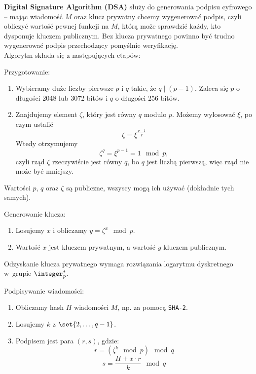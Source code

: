 \textbf{Digital Signature Algorithm (DSA)} służy do generowania podpisu cyfrowego -- mając wiadomość \( M \) oraz klucz prywatny chcemy wygenerować podpis, czyli obliczyć wartość pewnej funkcji na \( M \), którą może sprawdzić każdy, kto dysponuje kluczem publicznym.
Bez klucza prywatnego powinno być trudno wygenerować podpis przechodzący pomyślnie weryfikację. \\

\noindent
Algorytm składa się z następujących etapów:
\begin{greyframe}
	Przygotowanie:
	\begin{enumerate}
		\item Wybieramy duże liczby pierwsze \( p \) i \( q \) takie, że \( q \mid (p-1) \). Zaleca się \( p \) o długości 2048 lub 3072 bitów i \( q \) o długości 256 bitów.
		\item Znajdujemy element \( \zeta \), który jest równy \( q \) modulo \( p \). Możemy wylosować \( \xi \), po czym ustalić
		      \[
			      \zeta = \xi^{\frac{p-1}{q}}
		      \]
		      Wtedy otrzymujemy
		      \[
			      \zeta^q = \xi^{p-1} = 1 \mod p,
		      \]
		      czyli rząd \( \zeta \) rzeczywiście jest równy \( q \), bo \( q \) jest liczbą pierwszą, więc rząd nie może być mniejszy.
	\end{enumerate}
\end{greyframe}
Wartości \( p \), \( q \) oraz \( \zeta \) są publiczne, wszyscy mogą ich używać (dokładnie tych samych).

\begin{greyframe}
	Generowanie klucza:
	\begin{enumerate}
		\item Losujemy \( x \) i obliczamy \( y = \zeta^x \mod p \).
		\item Wartość \( x \) jest kluczem prywatnym, a wartość \( y \) kluczem publicznym.
	\end{enumerate}
\end{greyframe}
Odzyskanie klucza prywatnego wymaga rozwiązania logarytmu dyskretnego w~grupie \( \integer^{*}_p \).

\begin{greyframe}
	Podpisywanie wiadomości:
	\begin{enumerate}
		\item Obliczamy hash \( H \) wiadomości \( M \), np. za pomocą \texttt{SHA-2}.
		\item Losujemy \( k \) z \( \set{2, \ldots, q-1} \).
		\item Podpisem jest para \( (r, s) \), gdzie:
		      \[
			      r = (\zeta^k \mod p) \mod q
		      \]
		      \[
			      s = \frac{H + x \cdot r}{k} \mod q
		      \]
	\end{enumerate}
\end{greyframe}

